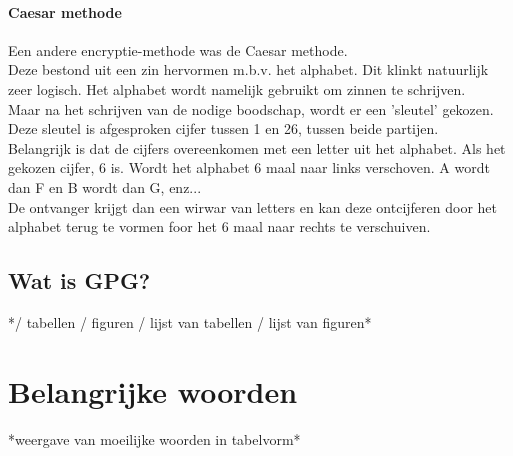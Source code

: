 \documentclass[12pt]{article}
\begin{document}
\paragraph{Caesar methode}
Een andere encryptie-methode was de Caesar methode.\\
Deze bestond uit een zin hervormen m.b.v. het alphabet. Dit klinkt natuurlijk zeer logisch.
Het alphabet wordt namelijk gebruikt om zinnen te schrijven.\\
Maar na het schrijven van de nodige boodschap, wordt er een 'sleutel' gekozen. Deze sleutel is afgesproken cijfer tussen 1 en 26, tussen beide partijen.\\
Belangrijk is dat de cijfers overeenkomen met een letter uit het alphabet. Als het gekozen cijfer, 6 is. Wordt het alphabet 6 maal naar links verschoven. A wordt dan F en B wordt dan G, enz...\\
De ontvanger krijgt dan een wirwar van letters en kan deze ontcijferen door het alphabet terug te vormen foor het 6 maal naar rechts te verschuiven.

\subsection{Wat is GPG?}

*/ tabellen / figuren / lijst van tabellen / lijst van figuren*

\section{Belangrijke woorden}\label{Belangrijke woorden}
*weergave van moeilijke woorden in tabelvorm*



\end{document}
